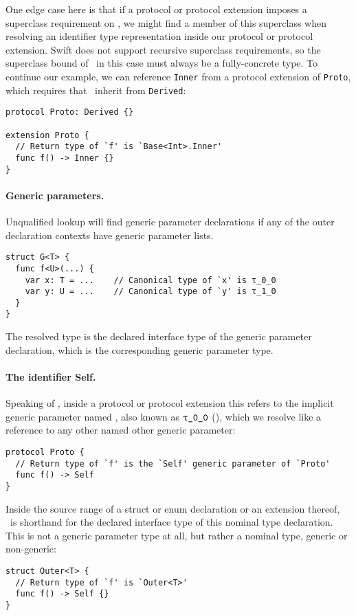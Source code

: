\documentclass[../generics]{subfiles}
\begin{document}
One edge case here is that if a protocol or protocol extension imposes a superclass requirement on \tSelf, we might find a member of this superclass when resolving an identifier type representation inside our protocol or protocol extension. Swift does not support recursive superclass requirements, so the superclass bound of \tSelf\ in this case must always be a fully-concrete type. To continue our example, we can reference \texttt{Inner} from a protocol extension of \texttt{Proto}, which requires that \tSelf\ inherit from \texttt{Derived}:
\begin{Verbatim}
protocol Proto: Derived {}

extension Proto {
  // Return type of `f' is `Base<Int>.Inner'
  func f() -> Inner {}
}
\end{Verbatim}

\paragraph{Generic parameters.}
Unqualified lookup will find generic parameter declarations if any of the outer declaration contexts have generic parameter lists.
\begin{Verbatim}
struct G<T> {
  func f<U>(...) {
    var x: T = ...    // Canonical type of `x' is τ_0_0
    var y: U = ...    // Canonical type of `y' is τ_1_0
  }
}
\end{Verbatim}
The resolved type is the declared interface type of the generic parameter declaration, which is the corresponding generic parameter type.

\paragraph{The identifier Self.}
Speaking of \tSelf, inside a protocol or protocol extension this refers to the \IndexSelf implicit generic parameter named \tSelf, also known as $\rT$ (), which we resolve like a reference to any other named other generic parameter:
\begin{Verbatim}
protocol Proto {
  // Return type of `f' is the `Self' generic parameter of `Proto'
  func f() -> Self
}
\end{Verbatim}

Inside the source range of a struct or enum declaration or an extension thereof, \tSelf\ is shorthand for the declared interface type of this nominal type declaration. This is not a generic parameter type at all, but rather a nominal type, generic or non-generic:
\begin{Verbatim}
struct Outer<T> {
  // Return type of `f' is `Outer<T>'
  func f() -> Self {}
}
\end{Verbatim}
\end{document}
